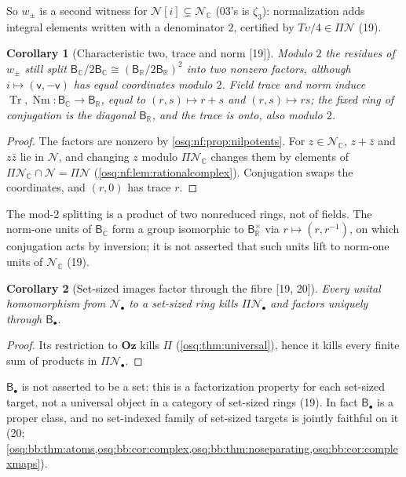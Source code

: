 \documentclass[11pt,letterpaper]{article}
\numberwithin{equation}{section}
\newtheorem{corollary}[corollary]{Corollary}
\theoremstyle{definition}
\theoremstyle{remark}
\theoremstyle{plain}
\newcommand{\Oz}{\mathbf{Oz}}
\newcommand{\R}{\mathbb R}
\newcommand{\C}{\mathbb C}
\newcommand{\NN}{\mathcal N}         %
\newcommand{\src}[1]{\textup{\textsf{[#1]}}}
\begin{document}
So $w_\pm$ is a second witness for $\NN[i]\subsetneq\NN_\C$ (03's is $\zeta_3$): normalization adds integral elements written with a
denominator $2$, certified by $T\upsilon/4\in\Pi\NN$ (19).

\begin{corollary}[Characteristic two, trace and norm \src{19}]\label{osq:nf:cor:tracenorm}
Modulo $2$ the residues of $w_\pm$ still split $\mathsf B_\C/2\mathsf B_\C\cong(\mathsf B_\R/2\mathsf B_\R)^2$ into two nonzero factors, although
$i\mapsto(\mathsf v,-\mathsf v)$ has equal coordinates modulo $2$. Field trace and norm induce $\operatorname{Tr},\operatorname{Nm}:\mathsf B_\C\to\mathsf B_\R$,
equal to $(r,s)\mapsto r+s$ and $(r,s)\mapsto rs$; the fixed ring of conjugation is the diagonal $\mathsf B_\R$, and the trace is onto, also
modulo $2$.
\end{corollary}
\begin{proof}
The factors are nonzero by \cref{osq:nf:prop:nilpotents}. For $z\in\NN_\C$, $z+\bar z$ and $z\bar z$ lie in $\NN$, and changing $z$ modulo
$\Pi\NN_\C$ changes them by elements of $\Pi\NN_\C\cap\NN=\Pi\NN$ (\cref{osq:nf:lem:rationalcomplex}). Conjugation swaps the coordinates, and
$(r,0)$ has trace $r$.
\end{proof}

The mod-2 splitting is a product of two nonreduced rings, not of fields. The norm-one units of $\mathsf B_\C$ form a group isomorphic to
$\mathsf B_\R^\times$ via $r\mapsto(r,r^{-1})$, on which conjugation acts by inversion; it is not asserted that such units lift to norm-one units of
$\NN_\C$ (19).

\begin{corollary}[Set-sized images factor through the fibre \src{19, 20}]\label{osq:nf:cor:small}
Every unital homomorphism from $\NN_\bullet$ to a set-sized ring kills $\Pi\NN_\bullet$ and factors uniquely through $\mathsf B_\bullet$.
\end{corollary}
\begin{proof}
Its restriction to $\Oz$ kills $\Pi$ (\cref{osq:thm:universal}), hence it kills every finite sum of products in $\Pi\NN_\bullet$.
\end{proof}

$\mathsf B_\bullet$ is not asserted to be a set: this is a factorization property for each set-sized target, not a universal object in a category of
set-sized rings (19). In fact $\mathsf B_\bullet$ is a proper class, and no set-indexed family of set-sized targets is jointly faithful on it
(20; \cref{osq:bb:thm:atoms,osq:bb:cor:complex,osq:bb:thm:noseparating,osq:bb:cor:complexmaps}).
\end{document}

